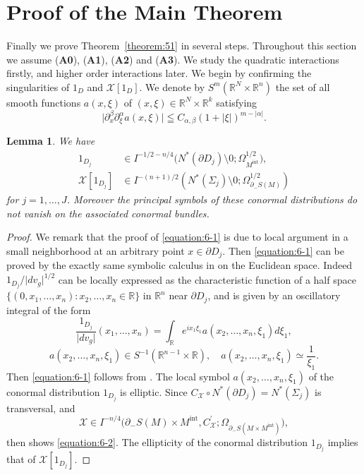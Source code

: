 \documentclass[a4paper,11pt,reqno]{amsart}
\numberwithin{equation}{section}
\newtheorem{lemma}[theorem]{Lemma}
\theoremstyle{definition}
\theoremstyle{remark}
\begin{document}
\section{Proof of the Main Theorem}
\label{section:proof}
Finally we prove Theorem~\ref{theorem:51} in several steps. 
Throughout this section we assume {\rm ({\bf A0})}, {\rm ({\bf A1})}, {\rm ({\bf A2})} and {\rm ({\bf A3})}.   
We study the quadratic interactions firstly, and  higher order interactions later.  
We begin by confirming the singularities of $1_D$ and $\mathcal{X}[1_D]$. 
We denote by $S^m(\mathbb{R}^N\times\mathbb{R}^n)$ 
the set of all smooth functions $a(x,\xi)$ of $(x,\xi)\in\mathbb{R}^N\times\mathbb{R}^k$ satisfying 
%
%
$$
\lvert\partial_x^\beta\partial_\xi^\alpha a(x,\xi)\rvert
\leqq
C_{\alpha,\beta}
(1+\lvert\xi\rvert)^{m-\lvert\alpha\rvert}. 
$$
%
%
\begin{lemma}
\label{theorem:6-1}
We have 
%
%
\begin{align}
  1_{D_j}
& \in 
  I^{-1/2-n/4}\bigl(N^\ast(\partial{D_j})\setminus0; \Omega^{1/2}_{M^\text{int}}\bigr),
\label{equation:6-1} 
\\
  \mathcal{X}[1_{D_j}]
& \in
  I^{-(n+1)/2}(N^\ast(\Sigma_j)\setminus0; \Omega_{\partial_-S(M)}^{1/2}) 
\label{equation:6-2}
\end{align}
%
%
for $j=1,\dotsc,J$. 
Moreover the principal symbols of these conormal distributions do not vanish on the associated conormal bundles.
\end{lemma}
%
%
\begin{proof}
We remark that the proof of \eqref{equation:6-1} is due to local argument 
in a small neighborhood at an arbitrary point $x \in \partial{D}_j$. 
Then \eqref{equation:6-1} can be proved by the exactly same symbolic calculus 
in \cite[Lemma~5.1]{Chihara} on the Euclidean space. 
Indeed $1_{D_j}/\lvert{dv_g}\rvert^{1/2}$ can be locally expressed as the characteristic function of a half space 
$\{(0,x_1,\dotsc,x_n) : x_2,\dotsc,x_n \in \mathbb{R}\}$ in $\mathbb{R}^n$ near $\partial{D_j}$, 
and is given by an oscillatory integral of the form 
%
%
$$
\frac{1_{D_j}}{\lvert{dv_g}\rvert}(x_1,\dotsc,x_n)
=
\int_{\mathbb{R}}
e^{ix_1\xi_1}
a(x_2,\dotsc,x_n,\xi_1)
d\xi_1,
$$
%
%
$$
a(x_2,\dotsc,x_n,\xi_1)
\in 
S^{-1}(\mathbb{R}^{n-1}\times\mathbb{R}),
\quad
a(x_2,\dotsc,x_n,\xi_1)
\simeq
\frac{1}{\xi_1}.  
$$
%
%
Then \eqref{equation:6-1} follows from \cite[Theorem~18.2.8]{Hoermander3}. 
The local symbol $a(x_2,\dotsc,x_n,\xi_1)$ of the conormal distribution 
$1_{D_j}$ is elliptic. 
Since $C_\mathcal{X}{\circ}N^\ast(\partial{D_j})=N^\ast(\Sigma_j)$ is transversal, and 
%
%
$$
\mathcal{X} \in I^{-n/4}\bigl(\partial_-S(M){\times}M^\text{int},C_\mathcal{X}^\prime; \Omega_{\partial_-S(M{\times}M^\text{int})}\bigr), 
$$
%
%
then \cite[Theorem~25.2.3]{Hoermander4} shows \eqref{equation:6-2}. 
The ellipticity of the conormal distribution $1_{D_j}$ implies that of $\mathcal{X}[1_{D_j}]$.  
\end{proof}
\end{document}
